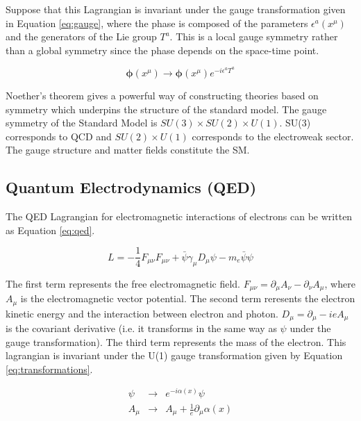 Suppose that this Lagrangian is invariant under the gauge transformation given
in Equation \ref{eq:gauge}, where the phase is composed of the parameters 
$\epsilon^{a}\left(x^{\mu}\right)$ and the generators of the Lie group $T^{a}$. 
This is a local gauge symmetry rather than a global symmetry since the phase 
depends on the space-time point. 

\begin{equation} 
\boldsymbol\phi(x^{\mu})\rightarrow \boldsymbol\phi(x^{\mu})e^{-i\epsilon^{a}T^{a}}
\label{eq:gauge}
\end{equation}

Noether's theorem gives a powerful way of constructing theories based on 
symmetry which underpins the structure of the standard model. The gauge
symmetry of the Standard Model is $SU(3)\times SU(2)\times U(1)$. SU(3) 
corresponds to QCD and $SU(2)\times U(1)$ corresponds to the electroweak
sector. The gauge structure and matter fields constitute the SM.

\subsection{Quantum Electrodynamics (QED)}

The QED Lagrangian for electromagnetic interactions of electrons can be written 
as Equation \ref{eq:qed}.

\begin{equation}
L = -\frac{1}{4}F_{\mu\nu}F_{\mu\nu} + \bar{\psi}\gamma_{\mu}D_{\mu}\psi
- m_{e}\bar{\psi}\psi
\label{eq:qed}
\end{equation} 

The first term represents the free electromagnetic field. $F_{\mu\nu} = 
\partial_{\mu}A_{\nu} - \partial_{\nu}A_{\mu}$, where $A_{\mu}$ is the 
electromagnetic vector potential. The second term reresents the electron kinetic 
energy and the interaction between electron and photon. $D_{\mu} = 
\partial_{\mu} - ieA_{\mu}$ is the covariant derivative (i.e. it transforms in 
the same way as $\psi$ under the gauge transformation). The third term 
represents the mass of the electron. This lagrangian is invariant under the U(1) 
gauge transformation given by Equation \ref{eq:transformations}.

\begin{eqnarray}
\psi &\rightarrow& e^{-i\alpha(x)}\psi \\
A_{\mu}   &\rightarrow& A_{\mu} + \frac{1}{e}\partial_{\mu}\alpha(x)
\label{eq:transformations}
\end{eqnarray}


